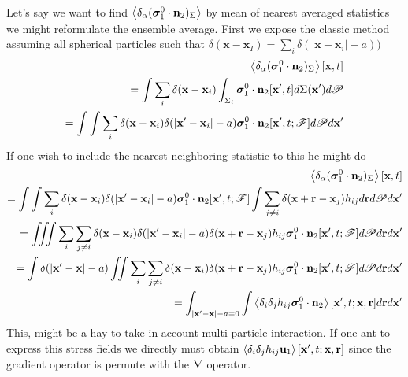 \documentclass[12pt]{My_preprint}
\begin{document}
Let's say we want to find $\left<\delta_\alpha ( \bm\sigma_1^0 \cdot \textbf{n}_2  )_{\Sigma}\right>$ by mean of nearest averaged statistics we might reformulate the ensemble average.
First we expose the classic method assuming all spherical particles such that $\delta(\textbf{x}-\textbf{x}_I) = \sum_i \delta(|\textbf{x}- \textbf{x}_i| - a))$
\begin{align*}
    \left<\delta_\alpha ( \bm\sigma_1^0 \cdot \textbf{n}_2  )_{\Sigma}\right>[\textbf{x},t]\\
    = \int\sum_i \delta(\textbf{x}-\textbf{x}_i)\int_{\Sigma_i} \bm\sigma_1^0 \cdot \textbf{n}_2 [\textbf{x}',t]d\Sigma(\textbf{x}')  d\mathscr{P}\\
    = 
    \int
    \int
    \sum_i  
    \delta(\textbf{x}-\textbf{x}_i)
    \delta(|\textbf{x}' - \textbf{x}_i| - a)
    \bm\sigma_1^0 \cdot \textbf{n}_2 [\textbf{x}',t;\mathscr{F}]
    d\mathscr{P}
    d\textbf{x}'
\end{align*}
If one wish to include the nearest neighboring statistic to this he might do
\begin{align*}
    \left<\delta_\alpha ( \bm\sigma_1^0 \cdot \textbf{n}_2  )_{\Sigma}\right>[\textbf{x},t]\\
    = 
    \int
    \int
    \sum_i  
    \delta(\textbf{x}-\textbf{x}_i)
    \delta(|\textbf{x}' - \textbf{x}_i| - a)
    \bm\sigma_1^0 \cdot \textbf{n}_2 [\textbf{x}',t;\mathscr{F}]
    \int\sum_{j\neq i} \delta(\textbf{x}+\textbf{r}-\textbf{x}_j)h_{ij} d\textbf{r}
    d\mathscr{P}
    d\textbf{x}'\\
    = 
    \iiint
    \sum_i  
    \sum_{j\neq i}
    \delta(\textbf{x}-\textbf{x}_i)
    \delta(|\textbf{x}' - \textbf{x}_i| - a)
    \delta(\textbf{x}+\textbf{r}-\textbf{x}_j)h_{ij} 
    \bm\sigma_1^0 \cdot \textbf{n}_2 [\textbf{x}',t;\mathscr{F}]
    d\mathscr{P}
    d\textbf{r}
    d\textbf{x}'\\
    = 
    \int
    \delta(|\textbf{x}' - \textbf{x}| - a)
    \iint
    \sum_i  
    \sum_{j\neq i}
    \delta(\textbf{x}-\textbf{x}_i)
    \delta(\textbf{x}+\textbf{r}-\textbf{x}_j)h_{ij} 
    \bm\sigma_1^0 \cdot \textbf{n}_2 [\textbf{x}',t;\mathscr{F}]
    d\mathscr{P}
    d\textbf{r}
    d\textbf{x}'\\
    = 
    \int_{|\textbf{x}' - \textbf{x}| - a = 0}
    \int
    \left<\delta_i\delta_j h_{ij} \bm\sigma_1^0 \cdot \textbf{n}_2 \right>[\textbf{x}',t;\textbf{x},\textbf{r}]
    d\textbf{r}
    d\textbf{x}'\\
\end{align*}
This, might be a hay to take in account multi particle interaction. 
If one ant to express this stress fields we directly must obtain $\left<\delta_i\delta_j h_{ij} \textbf u_1 \right>[\textbf{x}',t;\textbf{x},\textbf{r}]$ since the gradient operator is permute with the $\mathbf{\nabla}$ operator. 
\end{document}
